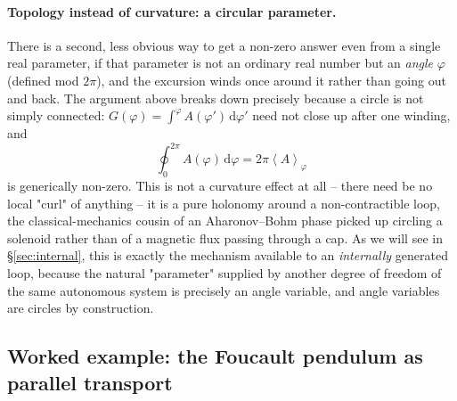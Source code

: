 \documentclass[11pt]{book}
\newcommand{\dd}{\mathrm{d}}
\newcommand{\avg}[1]{\left\langle #1 \right\rangle}
\begin{document}
\paragraph{Topology instead of curvature: a circular parameter.} There is a second, less obvious
way to get a non-zero answer even from a single real parameter, if that parameter is not an
ordinary real number but an \emph{angle} $\varphi$ (defined mod $2\pi$), and the excursion winds
once around it rather than going out and back. The argument above breaks down precisely because a
circle is not simply connected: $G(\varphi) = \int^\varphi A(\varphi')\,\dd\varphi'$ need not close
up after one winding, and
\begin{equation}
\oint_0^{2\pi} A(\varphi)\,\dd\varphi = 2\pi\avg{A}_\varphi
\end{equation}
is generically non-zero. This is not a curvature effect at all -- there need be no local "curl" of
anything -- it is a pure holonomy around a non-contractible loop, the classical-mechanics cousin of
an Aharonov--Bohm phase picked up circling a solenoid rather than of a magnetic flux passing
through a cap. As we will see in \S\ref{sec:internal}, this is exactly the mechanism available to
an \emph{internally} generated loop, because the natural "parameter" supplied by another degree of
freedom of the same autonomous system is precisely an angle variable, and angle variables are
circles by construction.

\subsection{Worked example: the Foucault pendulum as parallel transport}
\label{sec:foucault}
\end{document}

